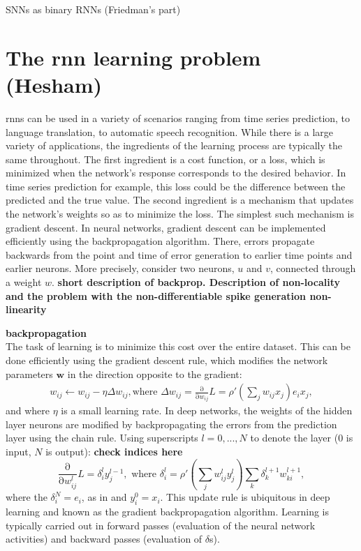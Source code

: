 \documentclass[journal,onecolumn,11pt]{IEEEtran}
\begin{document}
SNNs as binary RNNs (Friedman's part)

\section{The \gls{rnn} learning problem (Hesham)}
\glspl{rnn} can be used in a variety of scenarios ranging from time series prediction, to language translation, to automatic speech recognition. While there is a large variety of applications, the ingredients of the learning process are typically the same throughout. The first ingredient is a cost function, or a loss, which is minimized when the network's response corresponds to the desired behavior. In time series prediction for example, this loss could be the difference between the predicted and the true value. The second ingredient is a mechanism that updates the network's weights so as to minimize the loss. The simplest such mechanism is gradient descent. In neural networks, gradient descent can be implemented efficiently using the backpropagation algorithm.  There, errors propagate backwards from the point and time of error generation to earlier time points and earlier neurons. More precisely, consider two neurons, $u$ and $v$, connected through a weight $w$.
{\bf short description of backprop. Description of non-locality and the problem with the non-differentiable spike generation non-linearity}

{\bf backpropagation}\\
The task of learning is to minimize this cost over the entire dataset.
  This can be done efficiently using the gradient descent rule, which modifies the network parameters $\mathbf{w}$ in the direction opposite to the gradient:
  \begin{equation}\label{eq:bp_shallow}
    \begin{split}
      w_{ij} \leftarrow w_{ij} - \eta \Delta w_{ij},  \text{where } \Delta w_{ij} = \frac{\mathrm{\partial}}{\mathrm{\partial} w_{ij}} L = \rho'\left(\sum_j w_{ij} x_j\right) e_i x_j,
    \end{split}
  \end{equation}
  and where $\eta$ is a small learning rate. 
  In deep networks, the weights of the hidden layer neurons are modified by backpropagating the errors from the prediction layer using the chain rule. 
    Using superscripts $l=0,...,N$ to denote the layer ($0$ is input, $N$ is output):
  {\bf check indices here}
  \begin{equation}\label{eq:bp_deep}
      \frac{\mathrm{\partial}}{\mathrm{\partial} w^{l}_{ij}} L = \delta_{i}^{l}  y^{l-1}_j,\text{ where }\delta_{i}^{l} = \rho'\left(\sum_j w^{l}_{ij} y^{l}_j\right) \sum_k \delta_{k}^{l+1}w_{ki}^{l+1},
  \end{equation}
    where the $\delta_{i}^N=e_i$, as in  and $y_{i}^0=x_i$.
  This update rule is ubiquitous in deep learning \cite{Rumelhart_etal88_paradist} and known as the gradient backpropagation algorithm.   
  Learning is typically carried out in forward passes (evaluation of the neural network activities) and backward passes (evaluation of $\delta$s).
\end{document}
